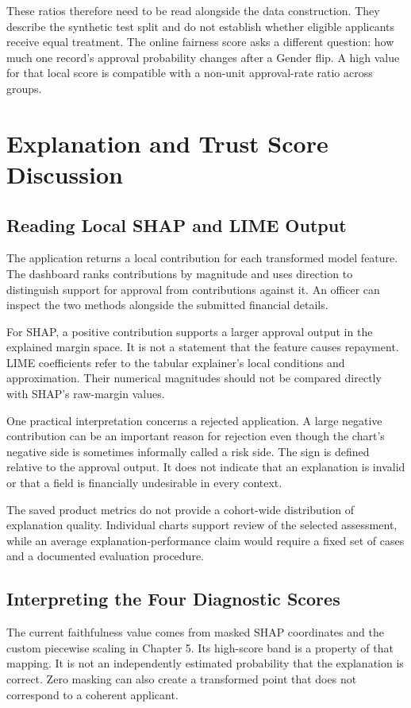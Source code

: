 These ratios therefore need to be read alongside the data construction. They describe the synthetic test split and do not establish whether eligible applicants receive equal treatment. The online fairness score asks a different question: how much one record's approval probability changes after a Gender flip. A high value for that local score is compatible with a non-unit approval-rate ratio across groups.

\section{Explanation and Trust Score Discussion}
\subsection{Reading Local SHAP and LIME Output}
The application returns a local contribution for each transformed model feature. The dashboard ranks contributions by magnitude and uses direction to distinguish support for approval from contributions against it. An officer can inspect the two methods alongside the submitted financial details.

For SHAP, a positive contribution supports a larger approval output in the explained margin space. It is not a statement that the feature causes repayment. LIME coefficients refer to the tabular explainer's local conditions and approximation. Their numerical magnitudes should not be compared directly with SHAP's raw-margin values.

One practical interpretation concerns a rejected application. A large negative contribution can be an important reason for rejection even though the chart's negative side is sometimes informally called a risk side. The sign is defined relative to the approval output. It does not indicate that an explanation is invalid or that a field is financially undesirable in every context.

The saved product metrics do not provide a cohort-wide distribution of explanation quality. Individual charts support review of the selected assessment, while an average explanation-performance claim would require a fixed set of cases and a documented evaluation procedure.

\subsection{Interpreting the Four Diagnostic Scores}
The current faithfulness value comes from masked SHAP coordinates and the custom piecewise scaling in Chapter 5. Its high-score band is a property of that mapping. It is not an independently estimated probability that the explanation is correct. Zero masking can also create a transformed point that does not correspond to a coherent applicant.

